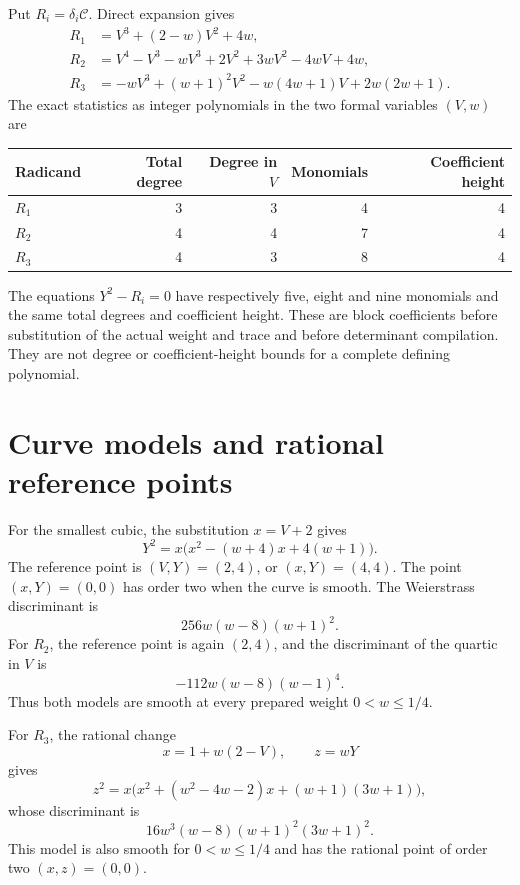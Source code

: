 \documentclass[11pt,a4paper]{article}
\begin{document}
Put $R_i=\delta_i\mathcal C$. Direct expansion gives
\begin{align}
 R_1&=V^3+(2-w)V^2+4w,\label{eq:smallcubic}\\
 R_2&=V^4-V^3-wV^3+2V^2+3wV^2-4wV+4w,\label{eq:quartic}\\
 R_3&=-wV^3+(w+1)^2V^2-w(4w+1)V+2w(2w+1).
 \label{eq:weightcubic}
\end{align}
The exact statistics as integer polynomials in the two formal
variables $(V,w)$ are
\begin{center}
\begin{tabular}{lrrrr}\toprule
Radicand&Total degree&Degree in $V$&Monomials&Coefficient height\\\midrule
$R_1$&3&3&4&4\\
$R_2$&4&4&7&4\\
$R_3$&4&3&8&4\\\bottomrule
\end{tabular}
\end{center}
The equations $Y^2-R_i=0$ have respectively five, eight and nine
monomials and the same total degrees and coefficient height.
These are block coefficients before substitution of the actual
weight and trace and before determinant compilation. They are not
degree or coefficient-height bounds for a complete defining polynomial.

\section{Curve models and rational reference points}

For the smallest cubic, the substitution $x=V+2$ gives
\begin{equation}\label{eq:modelone}
 Y^2=x\bigl(x^2-(w+4)x+4(w+1)\bigr).
\end{equation}
The reference point is $(V,Y)=(2,4)$, or $(x,Y)=(4,4)$.
The point $(x,Y)=(0,0)$ has order two when the curve is smooth.
The Weierstrass discriminant is
\[
                       256w(w-8)(w+1)^2.
\]
For $R_2$, the reference point is again $(2,4)$, and the
discriminant of the quartic in $V$ is
\[
                       -112w(w-8)(w-1)^4.
\]
Thus both models are smooth at every prepared weight
$0<w\le1/4$.

For $R_3$, the rational change
\[
 x=1+w(2-V),\qquad z=wY
\]
gives
\begin{equation}\label{eq:modelthree}
 z^2=x\bigl(x^2+(w^2-4w-2)x+(w+1)(3w+1)\bigr),
\end{equation}
whose discriminant is
\[
                   16w^3(w-8)(w+1)^2(3w+1)^2.
\]
This model is also smooth for $0<w\le1/4$ and has the rational
point of order two $(x,z)=(0,0)$.
\end{document}

